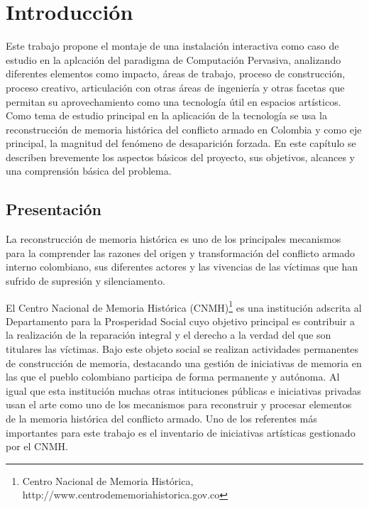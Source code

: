 
\chapter{Introducción}

Este trabajo propone el montaje de una instalación interactiva como caso de estudio en la aplcación del paradigma de Computación Pervasiva\cite{RN1}, analizando diferentes elementos como impacto, áreas de trabajo, proceso de construcción, proceso creativo, articulación con otras áreas de ingeniería y otras facetas que permitan su aprovechamiento como una tecnología útil en espacios artísticos. Como tema de estudio principal en la aplicación de la tecnología se usa la reconstrucción de memoria histórica del conflicto armado en Colombia y como eje principal, la magnitud del fenómeno de desaparición forzada. En este capítulo se describen brevemente los aspectos básicos del proyecto, sus objetivos, alcances y una comprensión básica del problema.    

\section{Presentación}

La reconstrucción de memoria histórica es uno de los principales mecanismos para la comprender las razones del origen y transformación del conflicto armado interno colombiano, sus diferentes actores y las vivencias de las víctimas que han sufrido de supresión y silenciamento. 

El Centro Nacional de Memoria Histórica (CNMH)\footnote{Centro Nacional de Memoria Histórica, http://www.centrodememoriahistorica.gov.co} es una institución adscrita al Departamento para la Prosperidad Social cuyo objetivo principal es contribuir a la realización de la reparación integral y el derecho a la verdad del que son titulares las víctimas. Bajo este objeto social se realizan actividades permanentes de construcción de memoria, destacando una gestión de iniciativas de memoria en las que el pueblo colombiano participa de forma permanente y autónoma. Al igual que esta institución muchas otras intituciones públicas e iniciativas privadas usan el arte como uno de los mecanismos para reconstruir y procesar elementos de la memoria histórica del conflicto armado. Uno de los referentes más importantes para este trabajo es el inventario de iniciativas artísticas gestionado por el CNMH. 

